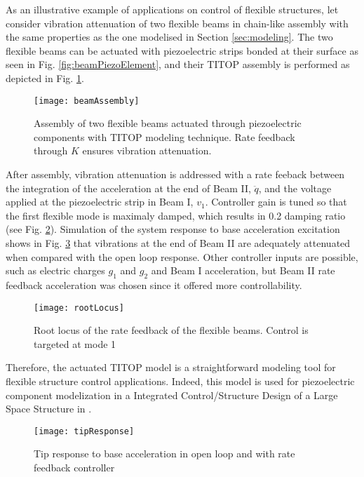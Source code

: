 \documentclass{ifacconf}
\begin{document}
As an illustrative example of applications on control of flexible structures, let consider vibration attenuation of two flexible beams in chain-like assembly with the same properties as the one modelised in Section \ref{sec:modeling}. The two flexible beams can be actuated with piezoelectric strips bonded at their surface as seen in Fig. \ref{fig:beamPiezoElement}, and their TITOP assembly is performed as depicted in Fig. \ref{fig:beamAssembly}.


\begin{figure} 
 \center
\texttt{[image: beamAssembly]}
\caption{Assembly of two flexible beams actuated through piezoelectric components with TITOP modeling technique. Rate feedback through $K$ ensures vibration attenuation.}
\label{fig:beamAssembly}
\end{figure}

After assembly, vibration attenuation is addressed with a rate feeback between the integration of the acceleration at the end of Beam II, $\ddot{q}$, and the voltage applied at the piezoelectric strip in Beam I, $v_1$. Controller gain is tuned so that the first flexible mode is maximaly damped, which results in 0.2 damping ratio (see Fig. \ref{fig:rootLocus}). Simulation of the system response to base acceleration excitation shows in Fig. \ref{fig:tipResponse} that vibrations at the end of Beam II are adequately attenuated when compared with the open loop response. Other controller inputs are possible, such as electric charges $g_1$ and $g_2$ and Beam I acceleration, but Beam II rate feedback acceleration was chosen since it offered more controllability. 

 \begin{figure} 
\texttt{[image: rootLocus]}
\caption{Root locus of the rate feedback of the flexible beams. Control is targeted at mode 1}
\label{fig:rootLocus}
\end{figure}

Therefore, the actuated TITOP model is a straightforward modeling tool for flexible structure control applications. Indeed, this model is used for piezoelectric component modelization in a Integrated Control/Structure Design of a Large Space Structure in \cite{Perez2016_ID}.


\begin{figure} 
\center
\texttt{[image: tipResponse]}
\caption{Tip response to base acceleration in open loop and with rate feedback controller}
\label{fig:tipResponse}
\end{figure}
\end{document}
